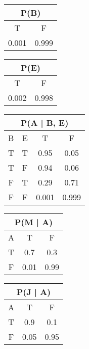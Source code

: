 \documentclass{article}
\begin{document}
\begin{tabular}{cc}
	\multicolumn{2}{c}{P(B)}                                 \\ \hline
	\multicolumn{1}{|c|}{T}     & \multicolumn{1}{c|}{F}     \\ \hline
	\multicolumn{1}{|c|}{0.001} & \multicolumn{1}{c|}{0.999} \\ \hline
\end{tabular}
\begin{tabular}{cc}
	\multicolumn{2}{c}{P(E)}                                 \\ \hline
	\multicolumn{1}{|c|}{T}     & \multicolumn{1}{c|}{F}     \\ \hline
	\multicolumn{1}{|c|}{0.002} & \multicolumn{1}{c|}{0.998} \\ \hline
\end{tabular}
\begin{tabular}{cccc}
	\multicolumn{4}{c}{P(A | B, E)}                                                                            \\ \hline
	\multicolumn{1}{|c|}{B} & \multicolumn{1}{c|}{E} & \multicolumn{1}{c|}{T}     & \multicolumn{1}{c|}{F}     \\ \hline
	\multicolumn{1}{|c|}{T} & \multicolumn{1}{c|}{T} & \multicolumn{1}{c|}{0.95}  & \multicolumn{1}{c|}{0.05}  \\ \hline
	\multicolumn{1}{|c|}{T} & \multicolumn{1}{c|}{F} & \multicolumn{1}{c|}{0.94}  & \multicolumn{1}{c|}{0.06}  \\ \hline
	\multicolumn{1}{|c|}{F} & \multicolumn{1}{c|}{T} & \multicolumn{1}{c|}{0.29}  & \multicolumn{1}{c|}{0.71}  \\ \hline
	\multicolumn{1}{|c|}{F} & \multicolumn{1}{c|}{F} & \multicolumn{1}{c|}{0.001} & \multicolumn{1}{c|}{0.999} \\ \hline
\end{tabular}
\begin{tabular}{ccc}
	\multicolumn{3}{c}{P(M | A)}                                                    \\ \hline
	\multicolumn{1}{|c|}{A} & \multicolumn{1}{c|}{T}    & \multicolumn{1}{c|}{F}    \\ \hline
	\multicolumn{1}{|c|}{T} & \multicolumn{1}{c|}{0.7}  & \multicolumn{1}{c|}{0.3}  \\ \hline
	\multicolumn{1}{|c|}{F} & \multicolumn{1}{c|}{0.01} & \multicolumn{1}{c|}{0.99} \\ \hline
\end{tabular}
\begin{tabular}{ccc}
	\multicolumn{3}{c}{P(J | A)}                                                    \\ \hline
	\multicolumn{1}{|c|}{A} & \multicolumn{1}{c|}{T}    & \multicolumn{1}{c|}{F}    \\ \hline
	\multicolumn{1}{|c|}{T} & \multicolumn{1}{c|}{0.9}  & \multicolumn{1}{c|}{0.1}  \\ \hline
	\multicolumn{1}{|c|}{F} & \multicolumn{1}{c|}{0.05} & \multicolumn{1}{c|}{0.95} \\ \hline
\end{tabular}
\end{document}

